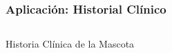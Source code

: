 \documentclass[14pt]{beamer}
\begin{document}
\begin{frame}
\frametitle{Aplicación: Historial Clínico}

\begin{columns}
\begin{column}{0.3\textwidth}
\begin{center}

\begin{small}
\caption{Historia Clínica de la Mascota}
\end{small}
\end{center}
\end{column}


\end{columns}
\end{frame}
\end{document}
